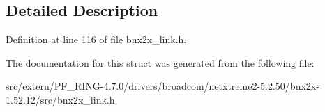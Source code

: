 \subsection{Detailed Description}


Definition at line 116 of file bnx2x\_\-link.h.



The documentation for this struct was generated from the following file:\begin{DoxyCompactItemize}
\item 
src/extern/PF\_\-RING-\/4.7.0/drivers/broadcom/netxtreme2-\/5.2.50/bnx2x-\/1.52.12/src/bnx2x\_\-link.h\end{DoxyCompactItemize}

